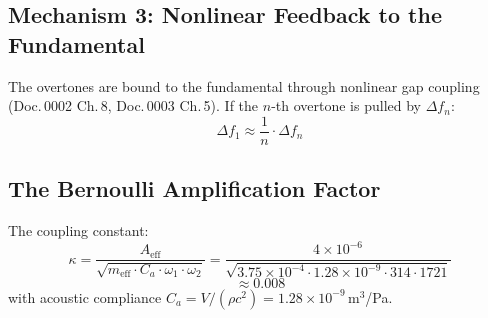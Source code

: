 \documentclass[11pt,a4paper]{article}
\begin{document}
\begin{table}[H]
\centering\small
{}
\caption{Impedance amplification $G(f)$ of the Helmholtz resonator at the overtones of the 50\,Hz reed ($f_H = 274$\,Hz, $Q_H = 7$). Phase values from Doc.\,0002 Ch.\,11.}
\end{table}

\subsection{Mechanism 3: Nonlinear Feedback to the Fundamental}

The overtones are bound to the fundamental through nonlinear gap coupling (Doc.\,0002 Ch.\,8, Doc.\,0003 Ch.\,5). If the $n$-th overtone is pulled by $\Delta f_n$:
\begin{equation}
\Delta f_1 \approx \frac{1}{n} \cdot \Delta f_n
\end{equation}

\subsection{The Bernoulli Amplification Factor}

The coupling constant:
\begin{equation}
\kappa = \frac{A_\text{eff}}{\sqrt{m_\text{eff} \cdot C_a \cdot \omega_1 \cdot \omega_2}}
       = \frac{4 \times 10^{-6}}{\sqrt{3{.}75 \times 10^{-4} \cdot 1{.}28 \times 10^{-9} \cdot 314 \cdot 1721}}
\end{equation}
\begin{equation*}
       \approx 0{.}008
\end{equation*}
with acoustic compliance $C_a = V / (\rho c^2) = 1{.}28 \times 10^{-9}$\,m$^3$/Pa.
\end{document}
